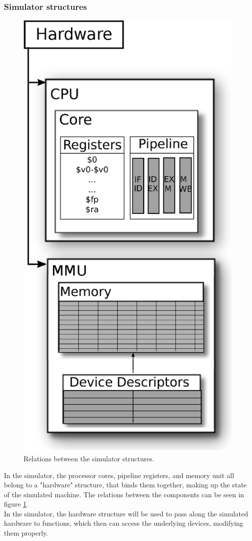 \subsubsection{Simulator structures}
\begin{figure}[H]
	\centering
	\includegraphics[scale=0.55]{pipeline/structure_layout.eps}
	\caption{Relations between the simulator structures.}
	\label{fig:structure_layout}
\end{figure}
In the simulator, the processor cores, pipeline registers, and memory unit all
belong to a "hardware" structure, that binds them together, making up the state
of the simulated machine. The relations between the components can be seen in figure
\ref{fig:structure_layout}.\\
In the simulator, the hardware structure will be used to pass along the
simulated hardware to functions, which then can access the underlying devices,
modifying them properly.

